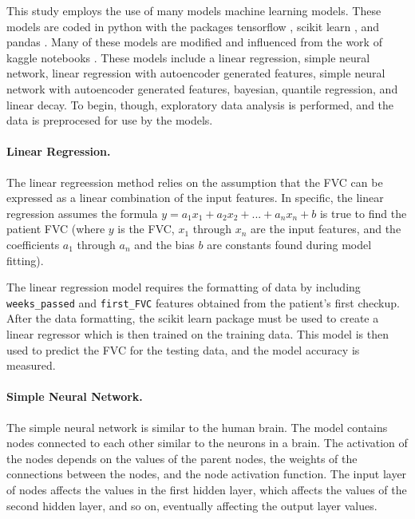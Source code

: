 \documentclass[12pt]{article}
\begin{document}
This study employs the use of many models machine learning models.
These models are coded in python \cite{10.5555/1593511} with the packages tensorflow \cite{tensorflow2015-whitepaper}, scikit learn \cite{scikit-learn}, and pandas \cite{mckinney2010data}.
Many of these models are modified and influenced from the work of kaggle notebooks \cite{kaggle}.
These models include a linear regression, simple neural network, linear regression with autoencoder generated features, simple neural network with autoencoder generated features, bayesian, quantile regression, and linear decay.
To begin, though, exploratory data analysis is performed, and the data is preprocesed for use by the models.

\paragraph*{Linear Regression.}

The linear regreession method relies on the assumption that the FVC can be expressed as a linear combination of the input features. 
In specific, the linear regression assumes the formula $y = a_1 x_1 + a_2 x_2 + ... + a_n x_n + b$ is true to find the patient FVC (where $y$ is the FVC, $x_1$ through $x_n$ are the input features, and the coefficients $a_1$ through $a_n$ and the bias $b$ are constants found during model fitting). 

The linear regression model requires the formatting of data by including {\tt weeks\_passed} and {\tt first\_FVC} features obtained from the patient's first checkup.
After the data formatting, the scikit learn package must be used to create a linear regressor which is then trained on the training data.
This model is then used to predict the FVC for the testing data, and the model accuracy is measured.

\paragraph*{Simple Neural Network.}

The simple neural network is similar to the human brain. 
The model contains nodes connected to each other similar to the neurons in a brain. 
The activation of the nodes depends on the values of the parent nodes, the weights of the connections between the nodes, and the node activation function. 
The input layer of nodes affects the values in the first hidden layer, which affects the values of the second hidden layer, and so on, eventually affecting the output layer values.
\end{document}
